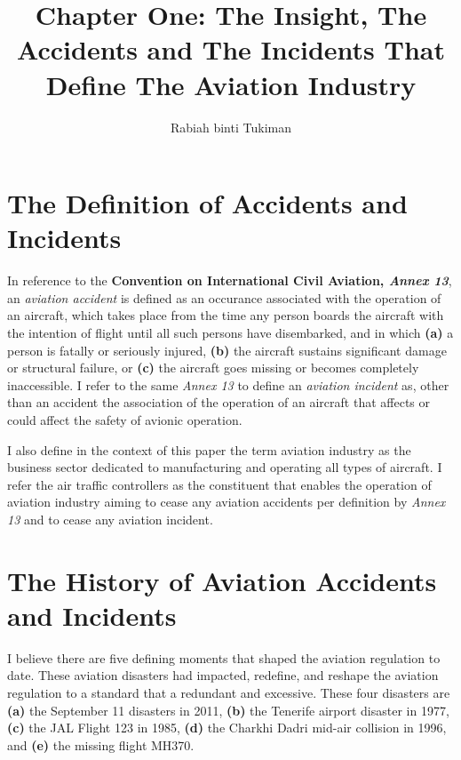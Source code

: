 \documentclass[a4paper,10pt]{article}
\title{Chapter One: The Insight, The Accidents and The Incidents That Define The Aviation Industry}
\author{Rabiah binti Tukiman}
\begin{document}
\maketitle


\section{The Definition of Accidents and Incidents}

In reference to the \textbf{Convention on International Civil Aviation, \textit{Annex 13}}, an \textit{aviation accident} is defined as an occurance 
associated with the operation of an aircraft, which takes place from the time any person boards the aircraft with the intention of flight 
until all such persons have disembarked, and in which 
\textbf{(a)} a person is fatally or seriously injured, 
\textbf{(b)} the aircraft sustains significant damage or structural failure, or 
\textbf{(c)} the aircraft goes missing or becomes completely inaccessible. 
I refer to the same \textit{Annex 13} to define an \textit{aviation incident} as, other than an accident
the association of the operation of an aircraft that affects or could affect the safety of avionic operation. \par
	I also define in the context of this paper the term aviation industry as the business sector dedicated to manufacturing and operating all types of aircraft. I refer the air traffic controllers as the constituent that enables the operation of aviation industry aiming to cease any aviation accidents per definition by \textit{Annex 13} and to cease any aviation incident.

\section{The History of Aviation Accidents and Incidents}
I believe there are five defining moments that shaped the aviation regulation to date. These aviation disasters had impacted, redefine, and reshape the aviation regulation to a standard that a redundant and excessive. These four disasters are 
\textbf{(a)} the September 11 disasters in 2011, 
\textbf{(b)} the Tenerife airport disaster in 1977, 
\textbf{(c)} the JAL Flight 123 in 1985,
\textbf{(d)} the Charkhi Dadri mid-air collision in 1996, and
\textbf{(e)} the missing flight MH370.
\end{document}
